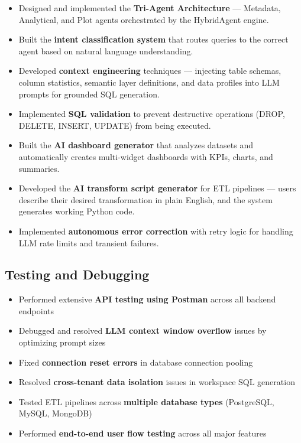\documentclass[12pt,a4paper]{report}
\begin{document}
\begin{itemize}[leftmargin=1.5cm]
    \item Designed and implemented the \textbf{Tri-Agent Architecture} --- Metadata, Analytical, and Plot agents orchestrated by the HybridAgent engine.
    \item Built the \textbf{intent classification system} that routes queries to the correct agent based on natural language understanding.
    \item Developed \textbf{context engineering} techniques --- injecting table schemas, column statistics, semantic layer definitions, and data profiles into LLM prompts for grounded SQL generation.
    \item Implemented \textbf{SQL validation} to prevent destructive operations (DROP, DELETE, INSERT, UPDATE) from being executed.
    \item Built the \textbf{AI dashboard generator} that analyzes datasets and automatically creates multi-widget dashboards with KPIs, charts, and summaries.
    \item Developed the \textbf{AI transform script generator} for ETL pipelines --- users describe their desired transformation in plain English, and the system generates working Python code.
    \item Implemented \textbf{autonomous error correction} with retry logic for handling LLM rate limits and transient failures.
\end{itemize}

\subsection{Testing and Debugging}

\begin{itemize}[leftmargin=1.5cm]
    \item Performed extensive \textbf{API testing using Postman} across all backend endpoints
    \item Debugged and resolved \textbf{LLM context window overflow} issues by optimizing prompt sizes
    \item Fixed \textbf{connection reset errors} in database connection pooling
    \item Resolved \textbf{cross-tenant data isolation} issues in workspace SQL generation
    \item Tested ETL pipelines across \textbf{multiple database types} (PostgreSQL, MySQL, MongoDB)
    \item Performed \textbf{end-to-end user flow testing} across all major features
\end{itemize}
\end{document}
